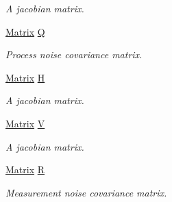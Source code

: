\begin{Indent}
\begin{DoxyCompactItemize}
\begin{DoxyCompactList}\small\item\em A jacobian matrix. \end{DoxyCompactList}\item 
\mbox{\hyperlink{classKalman_1_1EKFilter_a7cbc4cb4d9139a7f241b27110426af43}{Matrix}} \mbox{\hyperlink{classKalman_1_1EKFilter_a1f25e9c8bce9efb50cf3c3a5f3ba6822}{Q}}
\begin{DoxyCompactList}\small\item\em Process noise covariance matrix. \end{DoxyCompactList}\item 
\mbox{\hyperlink{classKalman_1_1EKFilter_a7cbc4cb4d9139a7f241b27110426af43}{Matrix}} \mbox{\hyperlink{classKalman_1_1EKFilter_ac10c3f39cdcb10bf3bcf30f48efdb48d}{H}}
\begin{DoxyCompactList}\small\item\em A jacobian matrix. \end{DoxyCompactList}\item 
\mbox{\hyperlink{classKalman_1_1EKFilter_a7cbc4cb4d9139a7f241b27110426af43}{Matrix}} \mbox{\hyperlink{classKalman_1_1EKFilter_a9289999f22782549b25b67c4ae81b1c5}{V}}
\begin{DoxyCompactList}\small\item\em A jacobian matrix. \end{DoxyCompactList}\item 
\mbox{\hyperlink{classKalman_1_1EKFilter_a7cbc4cb4d9139a7f241b27110426af43}{Matrix}} \mbox{\hyperlink{classKalman_1_1EKFilter_ae869345d1d3bb288d87b849556cf7c4f}{R}}
\begin{DoxyCompactList}\small\item\em Measurement noise covariance matrix. \end{DoxyCompactList}\end{DoxyCompactItemize}
\end{Indent}
